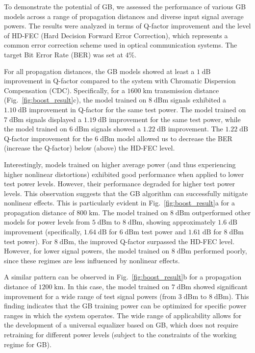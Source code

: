 To demonstrate the potential of GB, we assessed the performance of various GB models across a range of propagation distances and diverse input signal average powers. The results were analyzed in terms of Q-factor improvement and the level of HD-FEC (Hard Decision Forward Error Correction), which represents a common error correction scheme used in optical communication systems. The target Bit Error Rate (BER) was set at $4\%$.

For all propagation distances, the GB models showed at least a $1\;\textrm{dB}$ improvement in Q-factor compared to the system with Chromatic Dispersion Compensation (CDC). Specifically, for a $1600\;\textrm{km}$ transmission distance (Fig.~\ref{fig:boost_result}c), the model trained on $8\;\textrm{dBm}$ signals exhibited a $1.10\;\textrm{dB}$ improvement in Q-factor for the same test power. The model trained on $7\;\textrm{dBm}$ signals displayed a $1.19\;\textrm{dB}$ improvement for the same test power, while the model trained on $6\;\textrm{dBm}$ signals showed a $1.22\;\textrm{dB}$ improvement. The $1.22\;\textrm{dB}$ Q-factor improvement for the $6\;\textrm{dBm}$ model allowed us to decrease the BER (increase the Q-factor) below (above) the HD-FEC level.

Interestingly, models trained on higher average power (and thus experiencing higher nonlinear distortions) exhibited good performance when applied to lower test power levels. However, their performance degraded for higher test power levels. This observation suggests that the GB algorithm can successfully mitigate nonlinear effects. This is particularly evident in Fig.~\ref{fig:boost_result}a for a propagation distance of $800\;\textrm{km}$. The model trained on $8\;\textrm{dBm}$ outperformed other models for power levels from $5\;\textrm{dBm}$ to $8\;\textrm{dBm}$, showing approximately $1.6\;\textrm{dB}$ improvement (specifically, $1.64\;\textrm{dB}$ for $6\;\textrm{dBm}$ test power and $1.61\;\textrm{dB}$ for $8\;\textrm{dBm}$ test power). For $8\;\textrm{dBm}$, the improved Q-factor surpassed the HD-FEC level. However, for lower signal powers, the model trained on $8\;\textrm{dBm}$ performed poorly, since these regimes are less influenced by nonlinear effects.

A similar pattern can be observed in Fig.~\ref{fig:boost_result}b for a propagation distance of $1200\;\textrm{km}$. In this case, the model trained on $7\;\textrm{dBm}$ showed significant improvement for a wide range of test signal powers (from $3\;\textrm{dBm}$ to $8\;\textrm{dBm}$). This finding indicates that the GB training power can be optimized for specific power ranges in which the system operates. The wide range of applicability allows for the development of a universal equalizer based on GB, which does not require retraining for different power levels (subject to the constraints of the working regime for GB).



